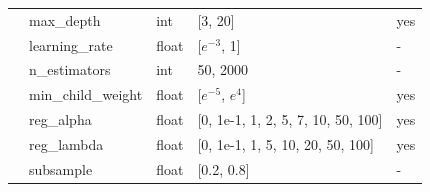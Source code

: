 \documentclass{article}
\begin{document}
\begin{table}[htbp]
\begin{tabular}{lllll}
    & max\_depth & int & [3, 20] & yes \\
    & learning\_rate & float & [$e^{-3}$, 1] & - \\
    & n\_estimators & int & 50, 2000 & - \\
    & min\_child\_weight & float & [$e^{-5}$, $e^4$] & yes \\
    & reg\_alpha & float & [0, 1e-1, 1, 2, 5, 7, 10, 50, 100] & yes \\
    & reg\_lambda & float & [0, 1e-1, 1, 5, 10, 20, 50, 100] & yes \\
    & subsample & float & [0.2, 0.8] & - \\
\bottomrule
\end{tabular}
\end{table}

\end{document}
